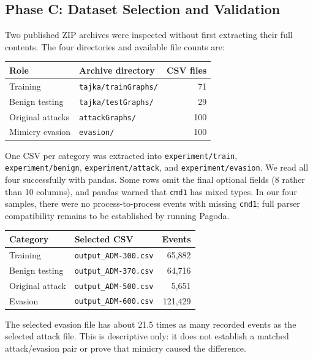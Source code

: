 \documentclass[11pt,letterpaper]{article}
\begin{document}
\subsection{Phase C: Dataset Selection and Validation}
Two published ZIP archives were inspected without first extracting their full contents. The four directories and available file counts are:
\begin{center}
\begin{tabular}{@{}llr@{}}\toprule
\textbf{Role} & \textbf{Archive directory} & \textbf{CSV files}\\\midrule
Training & \texttt{tajka/trainGraphs/} & 71\\
Benign testing & \texttt{tajka/testGraphs/} & 29\\
Original attacks & \texttt{attackGraphs/} & 100\\
Mimicry evasion & \texttt{evasion/} & 100\\\bottomrule
\end{tabular}
\end{center}

One CSV per category was extracted into \texttt{experiment/train}, \texttt{experiment/benign}, \texttt{experiment/attack}, and \texttt{experiment/evasion}. We read all four successfully with pandas. Some rows omit the final optional fields (8 rather than 10 columns), and pandas warned that \texttt{cmd1} has mixed types. In our four samples, there were no process-to-process events with missing \texttt{cmd1}; full parser compatibility remains to be established by running Pagoda.

\begin{center}
\begin{tabular}{@{}llr@{}}\toprule
\textbf{Category} & \textbf{Selected CSV} & \textbf{Events}\\\midrule
Training & \texttt{output\_ADM-300.csv} & 65,882\\
Benign testing & \texttt{output\_ADM-370.csv} & 64,716\\
Original attack & \texttt{output\_ADM-500.csv} & 5,651\\
Evasion & \texttt{output\_ADM-600.csv} & 121,429\\\bottomrule
\end{tabular}
\end{center}

The selected evasion file has about 21.5 times as many recorded events as the selected attack file. This is descriptive only: it does not establish a matched attack/evasion pair or prove that mimicry caused the difference.
\end{document}
